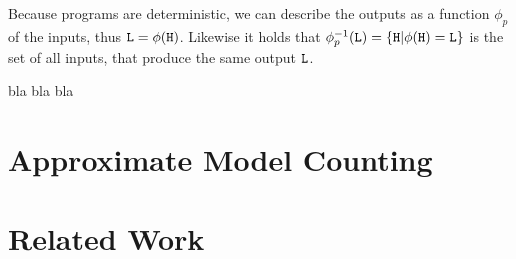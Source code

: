 Because programs are deterministic, we can describe the outputs as a function $\phi_p$ of the inputs, thus $\mathtt{L} = \phi(\mathtt{H})$. Likewise it holds that $\phi_p^{-1}(\mathtt{L}) = \{ \mathtt{H} | \phi(\mathtt{H}) = \mathtt{L} \}$ is the set of all inputs, that produce the same output $\mathtt{L}$.

\begin{definition}
        bla bla bla
\end{definition}

\section{Approximate Model Counting}



\section{Related Work}
